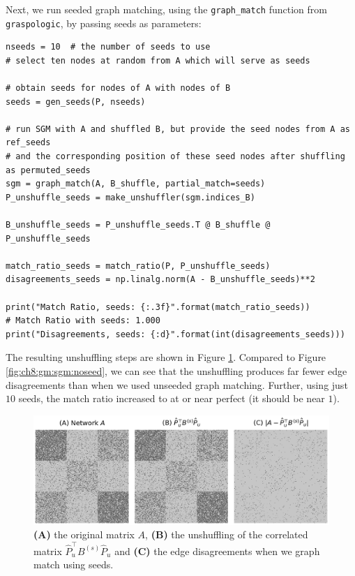 Next, we run seeded graph matching, using the \texttt{graph\_match} function from \texttt{graspologic}, by passing seeds as parameters:
\begin{lstlisting}[style=python]
nseeds = 10  # the number of seeds to use
# select ten nodes at random from A which will serve as seeds

# obtain seeds for nodes of A with nodes of B
seeds = gen_seeds(P, nseeds)

# run SGM with A and shuffled B, but provide the seed nodes from A as ref_seeds
# and the corresponding position of these seed nodes after shuffling as permuted_seeds
sgm = graph_match(A, B_shuffle, partial_match=seeds)
P_unshuffle_seeds = make_unshuffler(sgm.indices_B)

B_unshuffle_seeds = P_unshuffle_seeds.T @ B_shuffle @ P_unshuffle_seeds

match_ratio_seeds = match_ratio(P, P_unshuffle_seeds)
disagreements_seeds = np.linalg.norm(A - B_unshuffle_seeds)**2

print("Match Ratio, seeds: {:.3f}".format(match_ratio_seeds))
# Match Ratio with seeds: 1.000
print("Disagreements, seeds: {:d}".format(int(disagreements_seeds)))
\end{lstlisting}

The resulting unshuffling steps are shown in Figure \ref{fig:ch8:gm:sgm:seed}. Compared to Figure \ref{fig:ch8:gm:sgm:noseed}, we can see that the unshuffling produces far fewer edge disagreements than when we used unseeded graph matching. Further, using just $10$ seeds, the match ratio increased to at or near perfect (it should be near $1$). 

\begin{figure}[h]
    \centering
    \includegraphics[width=\linewidth]{applications/ch8/Images/gm_sgm_seed.png}
    \caption[Seeded graph matching]{\textbf{(A)} the original matrix $A$, \textbf{(B)} the unshuffling of the correlated matrix $\hat P_u^\top B^{(s)}\hat P_u$ and \textbf{(C)} the edge disagreements when we graph match using seeds.}
    \label{fig:ch8:gm:sgm:seed}
\end{figure}


